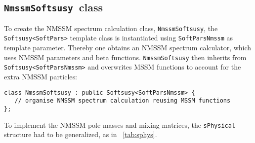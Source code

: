 \documentclass[final,3p,times,pdflatex]{elsarticle}
\def\code#1{\small{\tt #1}\normalsize}
\begin{document}
\subsection{\code{NmssmSoftsusy}~class}
\label{nmssmsoftsusy}

To create the NMSSM spectrum calculation class, \code{NmssmSoftsusy},
the \code{Softsusy<SoftPars>} template class is instantiated using
\code{SoftParsNmssm} as template parameter.  Thereby one obtains an
NMSSM spectrum calculator, which uses NMSSM parameters and beta
functions.  \code{NmssmSoftsusy} then inherits from
\code{Softsusy<SoftParsNmssm>} and overwrites MSSM functions to
account for the extra NMSSM particles:
%
\begin{verbatim}
class NmssmSoftsusy : public Softsusy<SoftParsNmssm> {
   // organise NMSSM spectrum calculation reusing MSSM functions
};
\end{verbatim}
%
To implement the NMSSM pole masses and mixing matrices, the
\code{sPhysical} structure had to be generalized, as in
\tablename~\ref{tab:sphys}.
%
\end{document}
